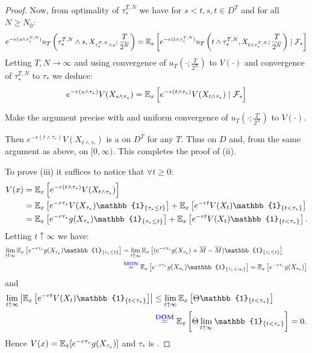 \begin{proof}
Now, from optimality of $\tau_*^{T,N}$ we have for $s < t, s, t \in D^T$ and for all $N \geq N_0$:
\[ e^{-r(s \wedge \tau_*^{T,N})} u_T \left( \tau_*^{T,N} \wedge s, X_{\tau_*^{T,N} \wedge s}; \frac{T}{2^N} \right) = \mathbb E_x \left[ e^{-r(t \wedge \tau_*^{T,N})} u_T \left( t \wedge \tau_*^{T,N}, X_{t \wedge \tau_*^{T,N}}; \frac{T}{2^N} \right) \mid \mathcal{F}_s \right] \]
Letting $T, N \to \infty$ and using convergence of $u_T(\cdot; \frac{T}{2^N})$ to $V(\cdot)$ and convergence of $\tau_*^{T,N}$ to $\tau_*$ we deduce:
\[ e^{-r(s \wedge \tau_*)} V(X_{s \wedge \tau_*}) = \mathbb E_x \left[ e^{-r(t \wedge \tau_*)} V(X_{t \wedge \tau_*}) \mid \mathcal{F}_s \right] \]

\begin{homework}
    Make the argument precise with  and uniform convergence of $u_T(\cdot; \frac{T}{2^N})$ to $V(\cdot)$.
\end{homework}

Then $e^{-r(t \wedge \tau_*)} V(X_{t \wedge \tau_*})$ is a  on $D^T$ for any $T$. Thus on $D$ and, from the same argument as above, on $[0, \infty)$. This completes the proof of (ii).

To prove (iii) it suffices to notice that $\forall t \geq 0$:
\begin{align*}
    V(x) &= \EE_x \left[ e^{-r(t \wedge \tau_*)} V(X_{t \wedge \tau_*}) \right] \\
    &= \EE_x \left[ e^{-r\tau_*} V(X_{\tau_*}) \mathbb{1}_{\{\tau_* \leq t\}} \right] + \EE_x \left[ e^{-rt} V(X_t) \mathbb{1}_{\{t < \tau_*\}} \right] \\
    &= \EE_x \left[ e^{-r\tau_*} g(X_{\tau_*}) \mathbb{1}_{\{\tau_* \leq t\}} \right] + \EE_x \left[ e^{-rt} V(X_t) \mathbb{1}_{\{t < \tau_*\}} \right].
\end{align*}
Letting $t \uparrow \infty$ we have:
\begin{align*}
    \lim_{t \uparrow \infty} \EE_x \left[ e^{-r\tau_*} g(X_{\tau_*}) \mathbb{1}_{\{\tau_* \leq t\}} \right] &= \lim_{t \uparrow \infty} \EE_x \left[ (e^{-r\tau_*} g(X_{\tau_*}) + \overline{M} - \overline{M}) \mathbb{1}_{\{\tau_* \leq t\}} \right] \\
    &\overset{\text{\vocab{MON}}}{=} \EE_x \left[ e^{-r\tau_*} g(X_{\tau_*}) \mathbb{1}_{\{\tau_* < \infty\}} \right] = \EE_x \left[ e^{-r\tau_*} g(X_{\tau_*}) \right]
\end{align*}
and
\begin{align*}
    \lim_{t \uparrow \infty} \left| \EE_x \left[ e^{-rt} V(X_t) \mathbb{1}_{\{t < \tau_*\}} \right] \right| &\leq \lim_{t \uparrow \infty} \EE_x \left[ \Theta \mathbb{1}_{\{t < \tau_*\}} \right] \\
    &\overset{\text{\vocab{DOM}}}{=} \EE_x \left[ \Theta \lim_{t \uparrow \infty} \mathbb{1}_{\{t < \tau_*\}} \right] = 0.
\end{align*}
Hence $V(x) = \mathbb E_x [ e^{-r\tau_*} g(X_{\tau_*}) ]$ and $\tau_*$ is .

\end{proof}

